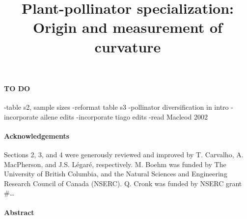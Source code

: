 \documentclass[]{article}
\title{Plant-pollinator specialization: Origin and measurement of curvature}
\author{}
\date{}
\let\oldparagraph\paragraph
\renewcommand{\paragraph}[1]{\oldparagraph{#1}\mbox{}}
\begin{document}
\maketitle

\hypertarget{to-do}{%
\paragraph{TO DO}\label{to-do}}

-table s2, sample sizes -reformat table s3 -pollinator diversification
in intro -incorporate ailene edits -incorporate tiago edits -read
Macleod 2002

\hypertarget{acknowledgements}{%
\paragraph{Acknowledgements}\label{acknowledgements}}

Sections 2, 3, and 4 were generously reviewed and improved by T.
Carvalho, A. MacPherson, and J.S. Légaré, respectively. M. Boehm was
funded by The University of British Columbia, and the Natural Sciences
and Engineering Research Council of Canada (NSERC). Q. Cronk was funded
by NSERC grant \#\ldots{}

\hypertarget{abstract}{%
\paragraph{Abstract}\label{abstract}}
\end{document}
